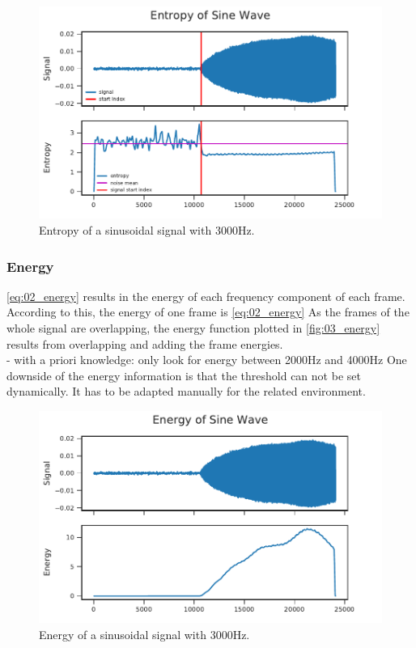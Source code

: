 
\begin{figure}[ht]
	\centering
		\includegraphics[]{figures/sine_entropy}
	\caption{Entropy of a sinusoidal signal with 3000Hz.}
\end{figure}
\label{fig:03_entropy}

\subsubsection*{Energy}

\ref{eq:02_energy} results in the energy of each frequency component of each frame.
According to this, the energy of one frame is \ref{eq:02_energy}
As the frames of the whole signal are overlapping, the energy function plotted in
\ref{fig:03_energy} results from overlapping and adding the frame energies.\\
- with a priori knowledge: only look for energy between 2000Hz and 4000Hz
One downside of the energy information is that the threshold can not be
set dynamically. It has to be adapted manually for the related environment.

\begin{figure}[ht]
	\centering
		\includegraphics[]{figures/sine_energy}
	\caption{Energy of a sinusoidal signal with 3000Hz.}
\end{figure}
\label{fig:03_energy}


